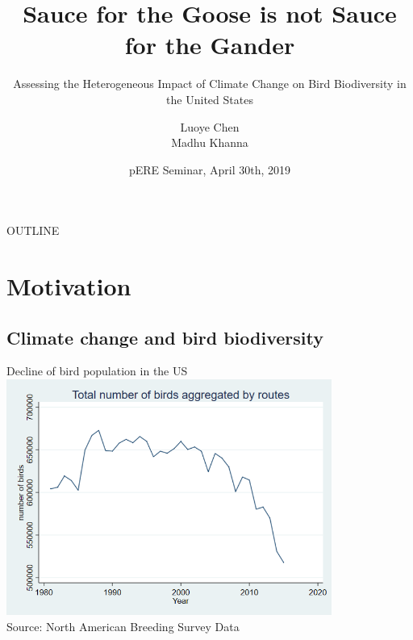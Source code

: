 \documentclass{beamer}
\title[Sauce for the Goose is not Sauce for the Gander] %
{Sauce for the Goose is not Sauce for the Gander}
\subtitle
{Assessing the Heterogeneous Impact of Climate Change on Bird Biodiversity in the United States}
\author[Luoye Chen] %
{Luoye Chen\\ Madhu Khanna\inst{1}}
\institute[UIUC-ACE] %
{
  \inst{1}%
  Department of Agricultural and Consumer Economics\\
  University of Illinois
}
\date[pERE 2018] %
{pERE Seminar, April 30th, 2019}
\begin{document}
\begin{frame}
  \titlepage
\end{frame}

\begin{frame}{OUTLINE}
  \tableofcontents
\end{frame}





\section{Motivation}

\subsection{Climate change and bird biodiversity}

\begin{frame}{Decline of bird population in the US}
  \includegraphics[width=0.8\textwidth]{bird-1.png}\\
  {\footnotesize  Source: North American Breeding Survey Data}
\end{frame}
\end{document}
